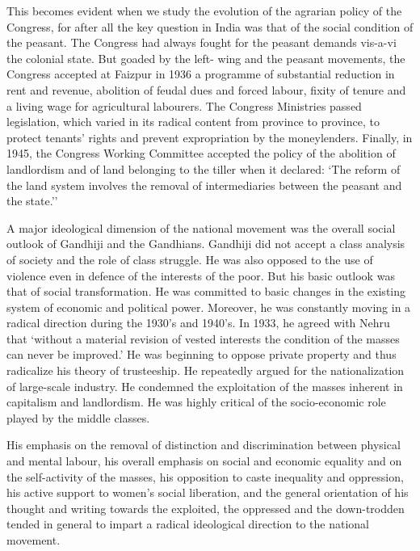 \begin{multicols}{2}
This becomes evident when we study the evolution of the agrarian policy of the Congress, for after all the key question in India was that of the social condition of the peasant. The Congress had always fought for the peasant demands vis-a-vi the colonial state. But goaded by the left- wing and the peasant movements, the Congress accepted at Faizpur in 1936 a programme of substantial reduction in rent and revenue, abolition of feudal dues and forced labour, fixity of tenure and a living wage for agricultural labourers. The Congress Ministries passed legislation, which varied in its radical content from province to province, to protect tenants' rights and prevent expropriation by the moneylenders. Finally, in 1945, the Congress Working Committee accepted the policy of the abolition of landlordism and of land belonging to the tiller when it declared: `The reform of the land system involves the removal of intermediaries between the peasant and the state.''

A major ideological dimension of the national movement was the overall social outlook of Gandhiji and the Gandhians. Gandhiji did not accept a class analysis of society and the role of class struggle. He was also opposed to the use of violence even in defence of the interests of the poor. But his basic outlook was that of social transformation. He was committed to basic changes in the existing system of economic and political power. Moreover, he was constantly moving in a radical direction during the 1930's and 1940's. In 1933, he agreed with Nehru that `without a material revision of vested interests the condition of the masses can never be improved.' He was beginning to oppose private property and thus radicalize his theory of trusteeship. He repeatedly argued for the nationalization of large-scale industry. He condemned the exploitation of the masses inherent in capitalism and landlordism. He was highly critical of the socio-economic role played by the middle classes.

His emphasis on the removal of distinction and discrimination between physical and mental labour, his overall emphasis on social and economic equality and on the self-activity of the masses, his opposition to caste inequality and oppression, his active support to women's social liberation, and the general orientation of his thought and writing towards the exploited, the oppressed and the down-trodden tended in general to impart a radical ideological direction to the national movement.


\end{multicols}
